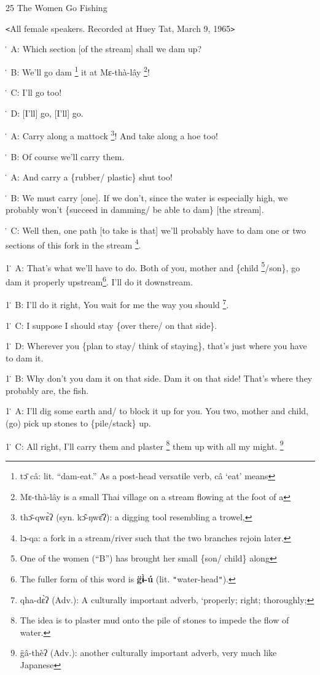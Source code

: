 
25 The Women Go Fishing

\texttt{<}All female speakers. Recorded at Huey Tat, March 9, 1965\texttt{>}

\. A: Which section [of the stream] shall we dam up?

\. B: We'll go dam \footnote{tɔ̄ câ: lit. ``dam-eat.'' As a post-head versatile verb, câ `eat' means} it at Mɛ-thà-lây \footnote{Mɛ-thà-lây is a small Thai village on a stream flowing at the foot of a}!

\. C: I'll go too!

\. D: [I'll] go, [I'll] go.

\. A: Carry along a mattock \footnote{thɔ̄-qwɛ̀ʔ (syn. kɔ̂-ŋwɛ̂ʔ): a digging tool resembling a trowel,}! And take along a hoe too!

\. B: Of course we'll carry them.

\. A: And carry a \{rubber/ plastic\} shut too!

\. B: We must carry [one]. If we don't, since the water is especially high, we
probably won't \{succeed in damming/ be able to dam\} [the stream].

\. C: Well then, one path [to take is that] we'll probably have to dam one or two
sections of this fork in the stream \footnote{lɔ-qa: a fork in a stream/river such that the two branches rejoin later.}.

1\. A: That's what we'll have to do. Both of you, mother and \{child \footnote{One of the women (``B'') has brought her small \{son/ child\} along}/son\},
go dam it properly upstream\footnote{The fuller form of this word is \textbf{g̈ɨ̀-ú} (lit. \texttt{"}water-head\texttt{"}).}. I'll do it downstream.

1\. B: I'll do it right, You wait for me the way you should \footnote{qha-dɛ̀ʔ (Adv.): A culturally important adverb, `properly; right; thoroughly;}.

1\. C: I suppose I should stay \{over there/ on that side\}.

1\. D: Wherever you \{plan to stay/ think of staying\}, that's just where you have
to dam it.

1\. B: Why don't you dam it on that side. Dam it on that side! That's where they
probably are, the fish.

1\. A: I'll dig some earth and/ to block it up for you.  You two, mother and child,
(go) pick up stones to \{pile/stack\} up.

1\. C: All right, I'll carry them and plaster \footnote{The idea is to plaster mud onto the pile of stones to impede the flow of water.} them up with all my might. \footnote{g̈â-thèʔ (Adv.): another culturally important adverb, very much like Japanese}

